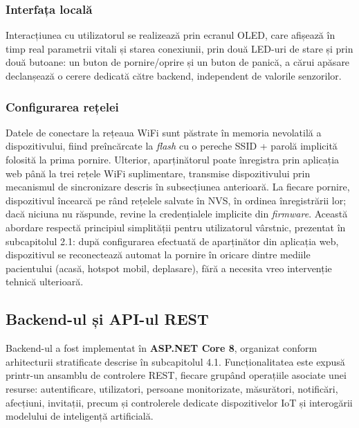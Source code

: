 \documentclass[12pt,a4paper]{article}
\begin{document}
\subsubsection{Interfața locală}

Interacțiunea cu utilizatorul se realizează prin ecranul OLED, care afișează în timp real parametrii vitali și starea conexiunii, prin două LED-uri de stare și prin două butoane: un buton de pornire/oprire și un buton de panică, a cărui apăsare declanșează o cerere dedicată către backend, independent de valorile senzorilor.


\subsubsection{Configurarea rețelei}

Datele de conectare la rețeaua WiFi sunt păstrate în memoria nevolatilă a dispozitivului, fiind preîncărcate la \textit{flash} cu o pereche SSID + parolă implicită folosită la prima pornire. Ulterior, aparținătorul poate înregistra prin aplicația web până la trei rețele WiFi suplimentare, transmise dispozitivului prin mecanismul de sincronizare descris în subsecțiunea anterioară. La fiecare pornire, dispozitivul încearcă pe rând rețelele salvate în NVS, în ordinea înregistrării lor; dacă niciuna nu răspunde, revine la credențialele implicite din \textit{firmware}. Această abordare respectă principiul simplității pentru utilizatorul vârstnic, prezentat în subcapitolul 2.1: după configurarea efectuată de aparținător din aplicația web, dispozitivul se reconectează automat la pornire în oricare dintre mediile pacientului (acasă, hotspot mobil, deplasare), fără a necesita vreo intervenție tehnică ulterioară.

\subsection{Backend-ul și API-ul REST}

Backend-ul a fost implementat în \textbf{ASP.NET Core 8}, organizat conform arhitecturii stratificate descrise în subcapitolul 4.1. Funcționalitatea este expusă printr-un ansamblu de controlere REST, fiecare grupând operațiile asociate unei resurse: autentificare, utilizatori, persoane monitorizate, măsurători, notificări, afecțiuni, invitații, precum și controlerele dedicate dispozitivelor IoT și interogării modelului de inteligență artificială.
\end{document}
